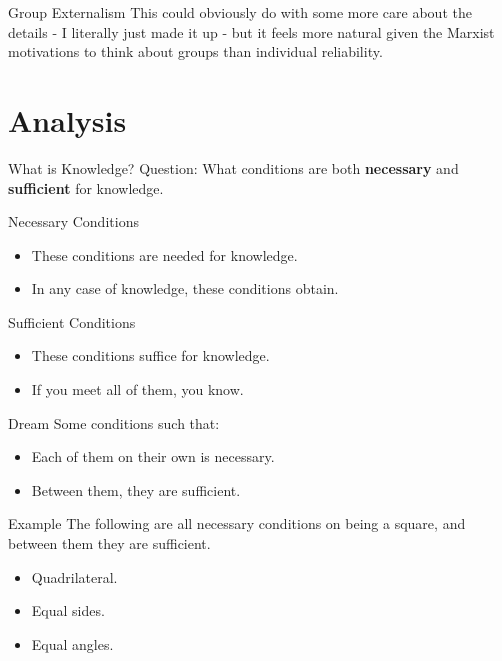 \documentclass[
  17pt,
  letterpaper,
  ignorenonframetext,
  aspectratio=169,
  handout]{beamer}
\providecommand{\tightlist}{%
  \setlength{\itemsep}{0pt}\setlength{\parskip}{0pt}}\usepackage{longtable,booktabs,array}
\begin{document}
\begin{frame}{Group Externalism}
\protect\hypertarget{group-externalism-1}{}
This could obviously do with some more care about the details - I
literally just made it up - but it feels more natural given the Marxist
motivations to think about groups than individual reliability.
\end{frame}

\hypertarget{analysis}{%
\section{Analysis}\label{analysis}}

\begin{frame}{What is Knowledge?}
\protect\hypertarget{what-is-knowledge}{}
Question: What conditions are both \textbf{necessary} and
\textbf{sufficient} for knowledge.
\end{frame}

\begin{frame}{Necessary Conditions}
\protect\hypertarget{necessary-conditions}{}
\begin{itemize}[<+->]
\tightlist
\item
  These conditions are needed for knowledge.
\item
  In any case of knowledge, these conditions obtain.
\end{itemize}
\end{frame}

\begin{frame}{Sufficient Conditions}
\protect\hypertarget{sufficient-conditions}{}
\begin{itemize}[<+->]
\tightlist
\item
  These conditions suffice for knowledge.
\item
  If you meet all of them, you know.
\end{itemize}
\end{frame}

\begin{frame}{Dream}
\protect\hypertarget{dream}{}
Some conditions such that:

\begin{itemize}[<+->]
\tightlist
\item
  Each of them on their own is necessary.
\item
  Between them, they are sufficient.
\end{itemize}
\end{frame}

\begin{frame}{Example}
\protect\hypertarget{example}{}
The following are all necessary conditions on being a square, and
between them they are sufficient.

\begin{itemize}[<+->]
\tightlist
\item
  Quadrilateral.
\item
  Equal sides.
\item
  Equal angles.
\end{itemize}
\end{frame}
\end{document}
